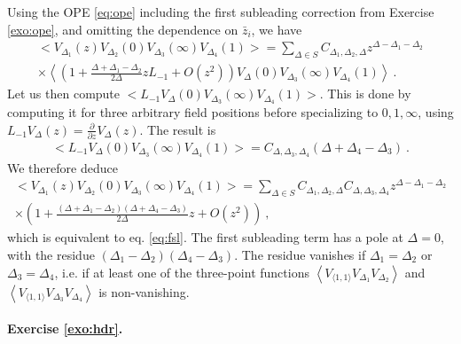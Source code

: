 \documentclass[12pt, a4paper]{article}
\theoremstyle{break}
\begin{document}
Using the OPE \eqref{eq:ope} including the first subleading correction from Exercise \ref{exo:ope}, and omitting the dependence on $\bar z_i$, we have 
\begin{multline}
 \Big<V_{\Delta_1}(z)V_{\Delta_2}(0)V_{\Delta_3}(\infty)V_{\Delta_4}(1)\Big> = \sum_{\Delta\in S} C_{\Delta_1,\Delta_2,\Delta} z^{\Delta-\Delta_1-\Delta_2}
 \\ \times 
 \left< \left(1 + \frac{\Delta+\Delta_1-\Delta_2}{2\Delta}z L_{-1} + O(z^2)\right) V_\Delta(0) V_{\Delta_3}(\infty)V_{\Delta_4}(1)\right>\ .
\end{multline}
Let us then compute $\Big< L_{-1} V_\Delta(0) V_{\Delta_3}(\infty)V_{\Delta_4}(1)\Big>$. This is done by computing it for three arbitrary field positions before specializing to $0,1,\infty$, using $L_{-1} V_\Delta(z) =\frac{\partial}{\partial z} V_\Delta(z)$. The result is 
\begin{align}
 \Big< L_{-1} V_\Delta(0) V_{\Delta_3}(\infty)V_{\Delta_4}(1)\Big> = C_{\Delta,\Delta_3,\Delta_4} (\Delta+\Delta_4-\Delta_3)\ .
\end{align}
We therefore deduce
\begin{multline}
 \Big<V_{\Delta_1}(z)V_{\Delta_2}(0)V_{\Delta_3}(\infty)V_{\Delta_4}(1)\Big> = \sum_{\Delta\in S} C_{\Delta_1,\Delta_2,\Delta} C_{\Delta,\Delta_3,\Delta_4} z^{\Delta-\Delta_1-\Delta_2}
 \\ \times 
 \left( 1+ \frac{(\Delta+\Delta_1-\Delta_2)(\Delta+\Delta_4-\Delta_3)}{2\Delta}z + O(z^2)\right) \ ,
\end{multline}
which is equivalent to eq. \eqref{eq:fsl}. The first subleading term has a pole at $\Delta=0$, with the residue $(\Delta_1-\Delta_2)(\Delta_4-\Delta_3)$. The residue vanishes if $\Delta_1=\Delta_2$ or $\Delta_3=\Delta_4$, i.e. if at least one of the three-point functions $\left< V_{\langle 1,1\rangle} V_{\Delta_1}V_{\Delta_2}\right>$ and $\left< V_{\langle 1,1\rangle} V_{\Delta_3}V_{\Delta_4}\right>$ is non-vanishing.

\paragraph{Exercise \ref{exo:hdr}.} 
\end{document}
